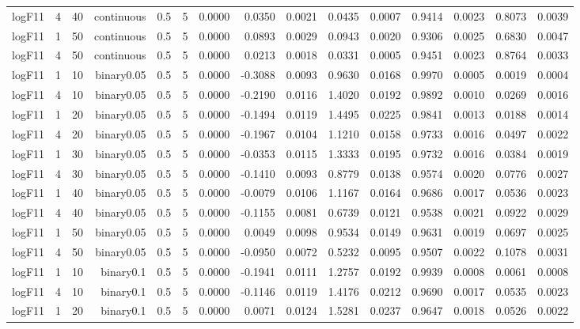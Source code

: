 \begin{longtable}{rrrrrrrrrrrrrrr}
  logF11 & 4 & 40 & continuous & 0.5 & 5 & 0.0000 & 0.0350 & 0.0021 & 0.0435 & 0.0007 & 0.9414 & 0.0023 & 0.8073 & 0.0039 \\ 
  logF11 & 1 & 50 & continuous & 0.5 & 5 & 0.0000 & 0.0893 & 0.0029 & 0.0943 & 0.0020 & 0.9306 & 0.0025 & 0.6830 & 0.0047 \\ 
  logF11 & 4 & 50 & continuous & 0.5 & 5 & 0.0000 & 0.0213 & 0.0018 & 0.0331 & 0.0005 & 0.9451 & 0.0023 & 0.8764 & 0.0033 \\ 
  logF11 & 1 & 10 & binary0.05 & 0.5 & 5 & 0.0000 & -0.3088 & 0.0093 & 0.9630 & 0.0168 & 0.9970 & 0.0005 & 0.0019 & 0.0004 \\ 
  logF11 & 4 & 10 & binary0.05 & 0.5 & 5 & 0.0000 & -0.2190 & 0.0116 & 1.4020 & 0.0192 & 0.9892 & 0.0010 & 0.0269 & 0.0016 \\ 
  logF11 & 1 & 20 & binary0.05 & 0.5 & 5 & 0.0000 & -0.1494 & 0.0119 & 1.4495 & 0.0225 & 0.9841 & 0.0013 & 0.0188 & 0.0014 \\ 
  logF11 & 4 & 20 & binary0.05 & 0.5 & 5 & 0.0000 & -0.1967 & 0.0104 & 1.1210 & 0.0158 & 0.9733 & 0.0016 & 0.0497 & 0.0022 \\ 
  logF11 & 1 & 30 & binary0.05 & 0.5 & 5 & 0.0000 & -0.0353 & 0.0115 & 1.3333 & 0.0195 & 0.9732 & 0.0016 & 0.0384 & 0.0019 \\ 
  logF11 & 4 & 30 & binary0.05 & 0.5 & 5 & 0.0000 & -0.1410 & 0.0093 & 0.8779 & 0.0138 & 0.9574 & 0.0020 & 0.0776 & 0.0027 \\ 
  logF11 & 1 & 40 & binary0.05 & 0.5 & 5 & 0.0000 & -0.0079 & 0.0106 & 1.1167 & 0.0164 & 0.9686 & 0.0017 & 0.0536 & 0.0023 \\ 
  logF11 & 4 & 40 & binary0.05 & 0.5 & 5 & 0.0000 & -0.1155 & 0.0081 & 0.6739 & 0.0121 & 0.9538 & 0.0021 & 0.0922 & 0.0029 \\ 
  logF11 & 1 & 50 & binary0.05 & 0.5 & 5 & 0.0000 & 0.0049 & 0.0098 & 0.9534 & 0.0149 & 0.9631 & 0.0019 & 0.0697 & 0.0025 \\ 
  logF11 & 4 & 50 & binary0.05 & 0.5 & 5 & 0.0000 & -0.0950 & 0.0072 & 0.5232 & 0.0095 & 0.9507 & 0.0022 & 0.1078 & 0.0031 \\ 
  logF11 & 1 & 10 & binary0.1 & 0.5 & 5 & 0.0000 & -0.1941 & 0.0111 & 1.2757 & 0.0192 & 0.9939 & 0.0008 & 0.0061 & 0.0008 \\ 
  logF11 & 4 & 10 & binary0.1 & 0.5 & 5 & 0.0000 & -0.1146 & 0.0119 & 1.4176 & 0.0212 & 0.9690 & 0.0017 & 0.0535 & 0.0023 \\ 
  logF11 & 1 & 20 & binary0.1 & 0.5 & 5 & 0.0000 & 0.0071 & 0.0124 & 1.5281 & 0.0237 & 0.9647 & 0.0018 & 0.0526 & 0.0022 \\ 

\end{longtable}
